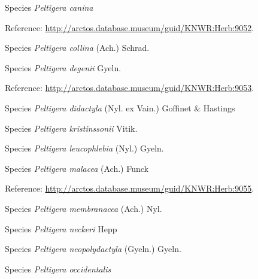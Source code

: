 \documentclass[9pt, article]{memoir}
\begin{document}
\begin{multicols}{2}
\vspace{6pt}\noindent\hspace{36pt}Species \textit{Peltigera canina}


\vspace{6pt}Reference: 
\url{http://arctos.database.museum/guid/KNWR:Herb:9052}.

\vspace{6pt}\noindent\hspace{36pt}Species \textit{Peltigera collina} (Ach.) Schrad.


\vspace{6pt}\noindent\hspace{36pt}Species \textit{Peltigera degenii} Gyeln.


\vspace{6pt}Reference: 
\url{http://arctos.database.museum/guid/KNWR:Herb:9053}.

\vspace{6pt}\noindent\hspace{36pt}Species \textit{Peltigera didactyla} (Nyl. ex Vain.) Goffinet \& Hastings


\vspace{6pt}\noindent\hspace{36pt}Species \textit{Peltigera kristinssonii} Vitik.


\vspace{6pt}\noindent\hspace{36pt}Species \textit{Peltigera leucophlebia} (Nyl.) Gyeln.


\vspace{6pt}\noindent\hspace{36pt}Species \textit{Peltigera malacea} (Ach.) Funck


\vspace{6pt}Reference: 
\url{http://arctos.database.museum/guid/KNWR:Herb:9055}.

\vspace{6pt}\noindent\hspace{36pt}Species \textit{Peltigera membranacea} (Ach.) Nyl.


\vspace{6pt}\noindent\hspace{36pt}Species \textit{Peltigera neckeri} Hepp


\vspace{6pt}\noindent\hspace{36pt}Species \textit{Peltigera neopolydactyla} (Gyeln.) Gyeln.


\vspace{6pt}\noindent\hspace{36pt}Species \textit{Peltigera occidentalis}



\end{multicols}
\end{document}
